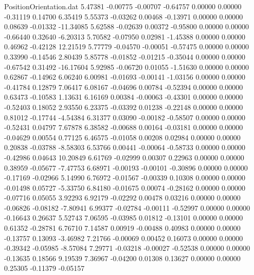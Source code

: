 \begin{filecontents}{PositionOrientation.dat}
   5.47381   -0.00775   -0.00707    -0.64757    0.00000    0.00000   -0.31119    0.14700    6.35419
   5.55373   -0.03262    0.00468    -0.13971    0.00000    0.00000    0.08639   -0.01332  -11.34085
   5.62588   -0.02639    0.00372    -0.95800    0.00000    0.00000   -0.66440    0.32640   -6.20313
   5.70582   -0.07950    0.02981    -1.45388    0.00000    0.00000    0.46962   -0.42128   12.21519
   5.77779   -0.04570   -0.00051    -0.57475    0.00000    0.00000    0.33990   -0.14546    2.80439
   5.85778   -0.01852   -0.01215    -0.35044    0.00000    0.00000   -0.67542    0.31492  -16.17604
   5.92985   -0.06720    0.01055    -1.51630    0.00000    0.00000    0.62867   -0.14962    6.06240
   6.00981   -0.01693   -0.00141    -1.03156    0.00000    0.00000   -0.41784    0.12879    7.06417
   6.08167   -0.04696    0.00784    -0.52394    0.00000    0.00000    0.63473   -0.10583    1.13631
   6.16169    0.00384   -0.00063    -0.43301    0.00000    0.00000   -0.52403    0.18052    2.93550
   6.23375   -0.03392    0.01238    -0.22148    0.00000    0.00000    0.81012   -0.17744   -4.54384
   6.31377    0.03090   -0.00182    -0.58507    0.00000    0.00000   -0.52431    0.04797    7.67878
   6.38582   -0.00688    0.00164    -0.03181    0.00000    0.00000   -0.04629    0.00554    0.77125
   6.46575   -0.01058    0.00208     0.02984    0.00000    0.00000    0.20838   -0.03788   -8.58303
   6.53766    0.00441   -0.00064    -0.58733    0.00000    0.00000   -0.42986    0.04643   10.20849
   6.61769   -0.02999    0.00307     0.22963    0.00000    0.00000    0.38959   -0.05677   -7.47753
   6.68971   -0.00193   -0.00101    -0.30896    0.00000    0.00000   -0.17169   -0.02966    5.14990
   6.76972   -0.01567   -0.00339     0.10308    0.00000    0.00000   -0.01498    0.05727   -5.33750
   6.84180   -0.01675    0.00074    -0.28162    0.00000    0.00000   -0.07716    0.05055    3.92293
   6.92179   -0.02292    0.00478     0.03216    0.00000    0.00000   -0.06826   -0.08182   -7.80941
   6.99377   -0.02784   -0.00111    -0.52997    0.00000    0.00000   -0.16643    0.26637    5.52743
   7.06595   -0.03985    0.01812    -0.13101    0.00000    0.00000    0.61352   -0.28781    6.76710
   7.14587    0.00919   -0.00488     0.40983    0.00000    0.00000   -0.13757    0.13093   -3.46982
   7.21766   -0.00069    0.00452     0.16073    0.00000    0.00000   -0.39342   -0.05985   -8.57084
   7.29771   -0.03218   -0.00027    -0.52538    0.00000    0.00000   -0.13635    0.18566    9.19539
   7.36967   -0.04200    0.01308     0.13627    0.00000    0.00000    0.25305   -0.11379   -0.05157

\end{filecontents}
